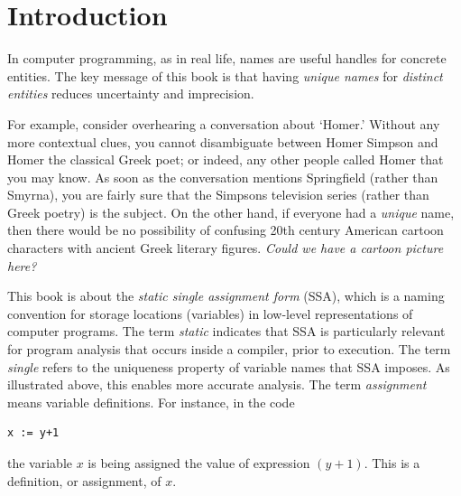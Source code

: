 \chapter{Introduction }

\graphicspath{{img/}{vanilla/img/}{part1/vanilla/img/}}




In computer programming, as in real life, 
names are useful handles for concrete entities.
The key message of this book is that
having \textit{unique names} for
\textit{distinct entities}
reduces uncertainty and imprecision.

For example, consider overhearing a conversation
about `Homer.' Without any more contextual clues, you
cannot disambiguate between Homer Simpson and Homer the
classical Greek poet; or indeed, any other people
called Homer that you may know.
As soon as the conversation mentions Springfield
(rather than Smyrna), you are fairly sure that the
Simpsons television series (rather than Greek poetry)
is the subject.
On the other hand, if everyone had a \textit{unique} name,
then there would be no possibility of confusing 20th century
American cartoon characters with ancient Greek literary figures.
\textit{Could we have a cartoon picture here?}

This book is about the \textit{static single assignment form} (SSA),
which is a naming convention for storage locations (variables)
in low-level representations
of computer programs.
The term \textit{static} indicates that SSA is particularly
relevant for program analysis that occurs inside a 
compiler, prior to execution.
The term \textit{single} refers to the uniqueness property of
variable names that SSA imposes. As illustrated above, this enables
more accurate analysis.
The term \textit{assignment} means variable definitions. For
instance, in the code 
\begin{verbatim}
x := y+1
\end{verbatim}
the variable $x$ is being assigned the value of expression $(y+1)$.
This is a definition, or assignment, of $x$.

